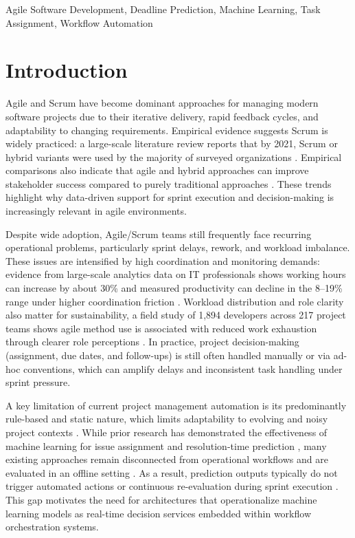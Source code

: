 \documentclass[conference]{IEEEtran}
\begin{document}
\begin{IEEEkeywords}
Agile Software Development, Deadline Prediction, Machine Learning, Task Assignment, Workflow Automation
\end{IEEEkeywords}


\section{Introduction}

Agile and Scrum have become dominant approaches for managing modern software projects due to their iterative delivery, rapid feedback cycles, and adaptability to changing requirements. Empirical evidence suggests Scrum is widely practiced: a large-scale literature review reports that by 2021, Scrum or hybrid variants were used by the majority of surveyed organizations \cite{verwijs2023_scrum}. Empirical comparisons also indicate that agile and hybrid approaches can improve stakeholder success compared to purely traditional approaches \cite{gemino2021_project_success}. These trends highlight why data-driven support for sprint execution and decision-making is increasingly relevant in agile environments.

Despite wide adoption, Agile/Scrum teams still frequently face recurring operational problems, particularly sprint delays, rework, and workload imbalance. These issues are intensified by high coordination and monitoring demands: evidence from large-scale analytics data on IT professionals shows working hours can increase by about 30\% and measured productivity can decline in the 8--19\% range under higher coordination friction \cite{gibbs2023_wfh_productivity}. Workload distribution and role clarity also matter for sustainability, a field study of 1,894 developers across 217 project teams shows agile method use is associated with reduced work exhaustion through clearer role perceptions \cite{venkatesh2020_work_exhaustion}. In practice, project decision-making (assignment, due dates, and follow-ups) is still often handled manually or via ad-hoc conventions, which can amplify delays and inconsistent task handling under sprint pressure.

A key limitation of current project management automation is its predominantly rule-based and static nature, which limits adaptability to evolving and noisy project contexts \cite{prinz2021_lowcode_slr, zhao2021_trigger_action}. While prior research has demonstrated the effectiveness of machine learning for issue assignment and resolution-time prediction \cite{diamantopoulos2023_issue_assignment, sousa2023_task_effort, nastos2025_resolution_time}, many existing approaches remain disconnected from operational workflows and are evaluated in an offline setting \cite{mahdi2021_spm_slr, cabral2023_ensemble_effort}. As a result, prediction outputs typically do not trigger automated actions or continuous re-evaluation during sprint execution \cite{prinz2021_lowcode_slr, yasmin2024_airflow_wac}. This gap motivates the need for architectures that operationalize machine learning models as real-time decision services embedded within workflow orchestration systems.
\end{document}
